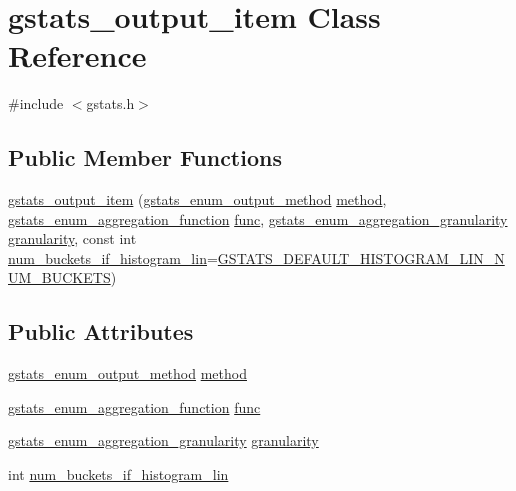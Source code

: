 \hypertarget{classgstats__output__item}{}\section{gstats\+\_\+output\+\_\+item Class Reference}
\label{classgstats__output__item}


{\ttfamily \#include $<$gstats.\+h$>$}

\subsection*{Public Member Functions}
\begin{DoxyCompactItemize}
\item 
\hyperlink{classgstats__output__item_aba1918b48bf95a14c7763e51566b6f38}{gstats\+\_\+output\+\_\+item} (\hyperlink{gstats_8h_a69c3463fdd73c04b651dbfcc1425650f}{gstats\+\_\+enum\+\_\+output\+\_\+method} \hyperlink{classgstats__output__item_a8c7b5166d5abe06e5e85d6acfdffb1f8}{method}, \hyperlink{gstats_8h_aa5e4744ebbda83fd3ef2ae3226461ac3}{gstats\+\_\+enum\+\_\+aggregation\+\_\+function} \hyperlink{classgstats__output__item_ad6e18ed2e1f2548806f9e7aeec9d6163}{func}, \hyperlink{gstats_8h_a625875e2a7c8582f278735673cfb398c}{gstats\+\_\+enum\+\_\+aggregation\+\_\+granularity} \hyperlink{classgstats__output__item_a30ab5df9d39a5149d2be27b242a0a63f}{granularity}, const int \hyperlink{classgstats__output__item_aa7b8faf49511b0a7cac1b2c9147780dc}{num\+\_\+buckets\+\_\+if\+\_\+histogram\+\_\+lin}=\hyperlink{gstats_8h_a1825fbb4f3d626ca97db468c8614e797}{G\+S\+T\+A\+T\+S\+\_\+\+D\+E\+F\+A\+U\+L\+T\+\_\+\+H\+I\+S\+T\+O\+G\+R\+A\+M\+\_\+\+L\+I\+N\+\_\+\+N\+U\+M\+\_\+\+B\+U\+C\+K\+E\+TS})
\end{DoxyCompactItemize}
\subsection*{Public Attributes}
\begin{DoxyCompactItemize}
\item 
\hyperlink{gstats_8h_a69c3463fdd73c04b651dbfcc1425650f}{gstats\+\_\+enum\+\_\+output\+\_\+method} \hyperlink{classgstats__output__item_a8c7b5166d5abe06e5e85d6acfdffb1f8}{method}
\item 
\hyperlink{gstats_8h_aa5e4744ebbda83fd3ef2ae3226461ac3}{gstats\+\_\+enum\+\_\+aggregation\+\_\+function} \hyperlink{classgstats__output__item_ad6e18ed2e1f2548806f9e7aeec9d6163}{func}
\item 
\hyperlink{gstats_8h_a625875e2a7c8582f278735673cfb398c}{gstats\+\_\+enum\+\_\+aggregation\+\_\+granularity} \hyperlink{classgstats__output__item_a30ab5df9d39a5149d2be27b242a0a63f}{granularity}
\item 
int \hyperlink{classgstats__output__item_aa7b8faf49511b0a7cac1b2c9147780dc}{num\+\_\+buckets\+\_\+if\+\_\+histogram\+\_\+lin}
\end{DoxyCompactItemize}


